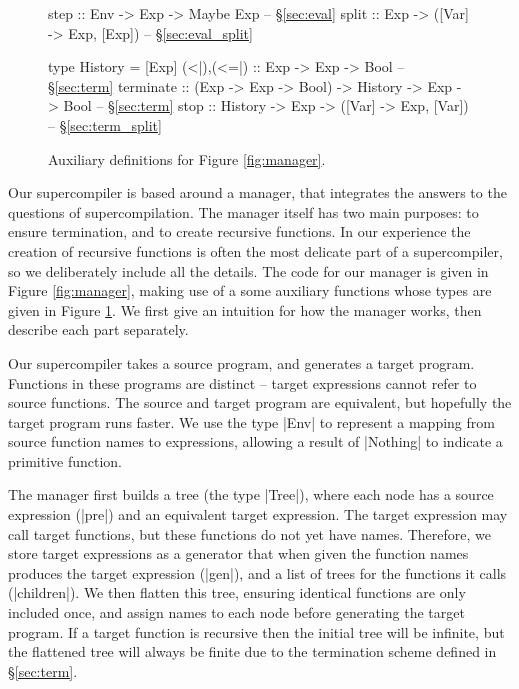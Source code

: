 \documentclass[draft]{sigplanconf}
\begin{document}
\begin{figure}
\begin{code}
step :: Env -> Exp -> Maybe Exp -- \S\ref{sec:eval}
split :: Exp -> ([Var] -> Exp, [Exp]) -- \S\ref{sec:eval_split}

type History = [Exp]
(<|),(<=|) :: Exp -> Exp -> Bool -- \S\ref{sec:term}
terminate  :: (Exp -> Exp -> Bool)
           -> History -> Exp -> Bool -- \S\ref{sec:term}
stop :: History -> Exp -> ([Var] -> Exp, [Var]) -- \S\ref{sec:term_split}
\end{code}
\caption{Auxiliary definitions for Figure \ref{fig:manager}.}
\label{fig:manager2}
\end{figure}

Our supercompiler is based around a manager, that integrates the answers to the questions of supercompilation. The manager itself has two main purposes: to ensure termination, and to create recursive functions. In our experience the creation of recursive functions is often the most delicate part of a supercompiler, so we deliberately include all the details. The code for our manager is given in Figure \ref{fig:manager}, making use of a some auxiliary functions whose types are given in Figure \ref{fig:manager2}. We first give an intuition for how the manager works, then describe each part separately.

Our supercompiler takes a source program, and generates a target program. Functions in these programs are distinct -- target expressions cannot refer to source functions. The source and target program are equivalent, but hopefully the target program runs faster. We use the type |Env| to represent a mapping from source function names to expressions, allowing a result of |Nothing| to indicate a primitive function.

The manager first builds a tree (the type |Tree|), where each node has a source expression (|pre|) and an equivalent target expression. The target expression may call target functions, but these functions do not yet have names. Therefore, we store target expressions as a generator that when given the function names produces the target expression (|gen|), and a list of trees for the functions it calls (|children|). We then flatten this tree, ensuring identical functions are only included once, and assign names to each node before generating the target program. If a target function is recursive then the initial tree will be infinite, but the flattened tree will always be finite due to the termination scheme defined in \S\ref{sec:term}.
\end{document}
